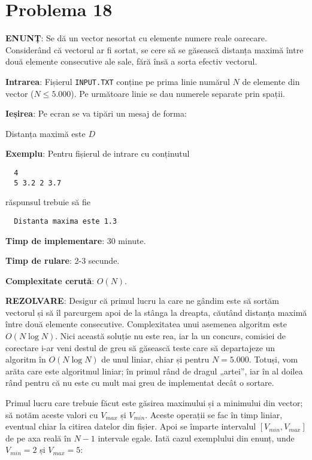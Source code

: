 \section{Problema 18}

{\bf ENUNȚ}: Se dă un vector nesortat cu elemente numere reale
oarecare. Considerând că vectorul ar fi sortat, se cere să se găsească
distanța maximă între două elemente consecutive ale sale, fără însă a sorta
efectiv vectorul.

{\bf Intrarea}: Fișierul {\tt INPUT.TXT} conține pe prima linie numărul $N$ de
elemente din vector ($N \leq 5.000$). Pe următoare linie se dau numerele
separate prin spații.

{\bf Ieșirea}: Pe ecran se va tipări un mesaj de forma:

Distanța maximă este $D$

{\bf Exemplu}: Pentru fișierul de intrare cu conținutul

\begin{verbatim}
  4
  5 3.2 2 3.7
\end{verbatim}

răspunsul trebuie să fie

\begin{verbatim}
  Distanta maxima este 1.3
\end{verbatim}

{\bf Timp de implementare}: 30 minute.

{\bf Timp de rulare}: 2-3 secunde.

{\bf Complexitate cerută}: $O(N)$.

{\bf REZOLVARE}: Desigur că primul lucru la care ne gândim este să sortăm
vectorul și să îl parcurgem apoi de la stânga la dreapta, căutând distanța
maximă între două elemente consecutive. Complexitatea unui asemenea algoritm
este $O(N \log N)$. Nici această soluție nu este rea, iar la un concurs,
comisiei de corectare i-ar veni destul de greu să găsească teste care să
departajeze un algoritm în $O(N \log N)$ de unul liniar, chiar și pentru $N =
5.000$. Totuși, vom arăta care este algoritmul liniar; în primul rând de
dragul „artei”, iar în al doilea rând pentru că nu este cu mult mai greu de
implementat decât o sortare.

Primul lucru care trebuie făcut este găsirea maximului și a minimului din
vector; să notăm aceste valori cu $V_{max}$ și $V_{min}$. Aceste operații se
fac în timp liniar, eventual chiar la citirea datelor din fișier. Apoi se
împarte intervalul $[V_{min}, V_{max}]$ de pe axa reală în $N-1$ intervale
egale. Iată cazul exemplului din enunț, unde $V_{min} = 2$ și $V_{max} = 5$:

